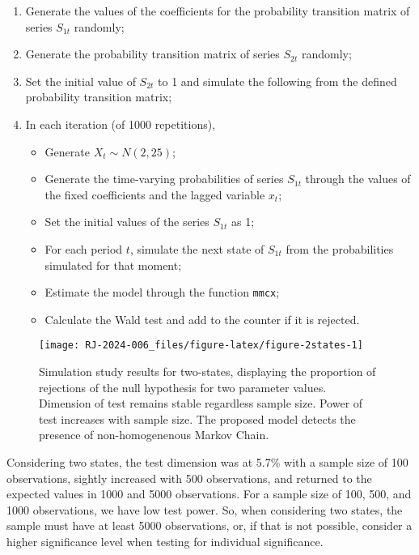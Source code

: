 \begin{enumerate}
\def\labelenumi{\arabic{enumi}.}
\tightlist
\item
  Generate the values of the coefficients for the probability transition matrix of series \(S_{1t}\) randomly;
\item
  Generate the probability transition matrix of series \(S_{2t}\) randomly;
\item
  Set the initial value of \(S_{2t}\) to 1 and simulate the following from the defined probability transition matrix;
\item
  In each iteration (of 1000 repetitions),

  \begin{itemize}
  \tightlist
  \item
    Generate \(X_t \sim N(2,25)\);
  \item
    Generate the time-varying probabilities of series \(S_{1t}\) through the values of the fixed coefficients and the lagged variable \(x_t\);
  \item
    Set the initial values of the series \(S_{1t}\) as 1;
  \item
    For each period \(t\), simulate the next state of \(S_{1t}\) from the probabilities simulated for that moment;
  \item
    Estimate the model through the function \texttt{mmcx};
  \item
    Calculate the Wald test and add to the counter if it is rejected.
  \end{itemize}
\end{enumerate}

\begin{figure}

{\centering \texttt{[image: RJ-2024-006\_files/figure-latex/figure-2states-1]} 

}

\caption{Simulation study results for two-states, displaying the proportion of rejections of the null hypothesis for two parameter values. Dimension of test remains stable regardless sample size. Power of test increases with sample size. The proposed model detects the presence of non-homogenenous Markov Chain.}\label{fig:figure-2states}
\end{figure}

Considering two states, the test dimension was at 5.7\% with a sample size of 100 observations, sightly increased with 500 observations, and returned to the expected values in 1000 and 5000 observations. For a sample size of 100, 500, and 1000 observations, we have low test power. So, when considering two states, the sample must have at least 5000 observations, or, if that is not possible, consider a higher significance level when testing for individual significance.

